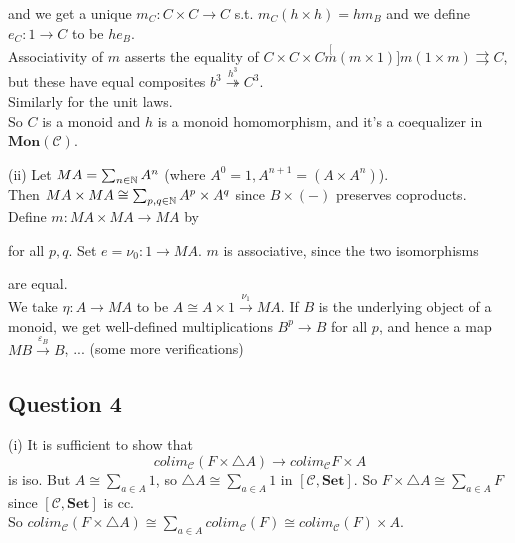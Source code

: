 \documentclass[a4paper]{article}
\begin{document}
and we get a unique $m_C:C \times C \to C$ s.t. $m_C(h \times h) = hm_B$ and we define $e_C:1 \to C$ to be $he_B$.\\
Associativity of $m$ asserts the equality of $C \times C \times C \stackrel[m(m \times 1)]{m(1 \times m)}{\rightrightarrows} C$, but these have equal composites $b^3 \stackrel{h^3}{\twoheadrightarrow} C^3$.\\
Similarly for the unit laws.\\
So $C$ is a monoid and $h$ is a monoid homomorphism, and it's a coequalizer in $\mathbf{Mon}(\mathcal{C})$.

(ii) Let $MA = \sum_{n \in \mathbb{N}} A^n$ (where $A^0 = 1, A^{n+1} = (A \times A^n)$).\\
Then $MA \times MA \cong \sum_{p,q \in \mathbb{N}} A^p \times A^q$ since $B \times (-)$ preserves coproducts.\\
Define $m:MA \times MA \to MA$ by 


for all $p,q$. Set $e = \nu_0:1 \to MA$. $m$ is associative, since the two isomorphisms 


are equal.\\
We take $\eta: A \to MA$ to be $A \cong A \times 1 \xrightarrow{\nu_1} MA$. If $B$ is the underlying object of a monoid, we get well-defined multiplications $B^p \to B$ for all $p$, and hence a map $MB \xrightarrow{\varepsilon_B} B$, ... (some more verifications)

\subsection{Question 4}
(i) It is sufficient to show that
$$colim_{\mathcal{C}}(F \times \triangle A) \to colim_{\mathcal{C}} F \times A$$
is iso. But $A \cong \sum_{a \in A} 1$, so $\triangle A \cong \sum_{a \in A} 1$ in $[\mathcal{C},\mathbf{Set}]$. So $F \times \triangle A \cong \sum_{a \in A} F$ since $[\mathcal{C},\mathbf{Set}]$ is cc.\\
So $colim_{\mathcal{C}}(F \times \triangle A) \cong \sum_{a \in A} colim_{\mathcal{C}} (F) \cong colim_{\mathcal{C}} (F) \times A$.
\end{document}
